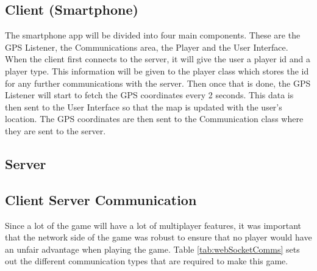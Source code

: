 \documentclass{l4proj}
\begin{document}
\subsection{Client (Smartphone)}
The smartphone app will be divided into four main components. These are the GPS Listener, the Communications area, the
Player and the User Interface. When the client first connects to the server, it will give the user a player id and a player
type. This information will be given to the player class which stores the id for any further communications with the server.
Then once that is done, the GPS Listener will start to fetch the GPS coordinates every 2 seconds. This data is then sent
to the User Interface so that the map is updated with the user's location. The GPS coordinates are then sent to the Communication
class where they are sent to the server.

\subsection{Server}


\subsection{Client Server Communication}
\label{communication}
Since a lot of the game will have a lot of multiplayer features, it was important that the network side of the game
was robust to ensure that no player would have an unfair advantage when playing the game. Table \ref{tab:webSocketComms}
sets out the different communication types that are required to make this game.

\begin{table}[]
    \caption{The different communication types to the server  }\label{tab:webSocketComms}
    
    \end{table}
\end{document}
